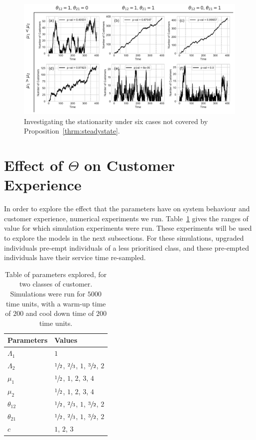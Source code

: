 \documentclass{article}
\begin{document}
\begin{figure}[!htbp]
  \begin{center}
    \includegraphics[width=\textwidth]{img/adf_theorem_gap.pdf}
    \caption{Investigating the stationarity under six cases not covered by
    Proposition~\ref{thrm:steadystate}.}
    \label{fig:adf_gap}
  \end{center}
\end{figure}


\section{Effect of $\Theta$ on Customer Experience}\label{sec:behaviour}
In order to explore the effect that the parameters have on system behaviour and
customer experience, numerical experiments we run.
Table~\ref{tbl:parameter_sweep} gives the ranges of value for which simulation
experiments were run. These experiments will be used to explore the models in
the next subsections. For these simulations, upgraded individuals pre-empt
individuals of a less prioritised class, and these pre-empted individuals have
their service time re-sampled.

\begin{table}
\begin{center}
\begin{tabular}{ll}
\toprule
Parameters & Values \\
\midrule
$\Lambda_1$ & $1$ \\
$\Lambda_2$ & $\sfrac{1}{2}$, $\sfrac{2}{3}$, $1$, $\sfrac{3}{2}$, $2$ \\
$\mu_1$ & $\sfrac{1}{2}$, $1$, $2$, $3$, $4$ \\
$\mu_2$ & $\sfrac{1}{2}$, $1$, $2$, $3$, $4$ \\
$\theta_{12}$ & $\sfrac{1}{2}$, $\sfrac{2}{3}$, $1$, $\sfrac{3}{2}$, $2$ \\
$\theta_{21}$ & $\sfrac{1}{2}$, $\sfrac{2}{3}$, $1$, $\sfrac{3}{2}$, $2$ \\
$c$ & $1$, $2$, $3$ \\
\bottomrule
\end{tabular}
\caption{Table of parameters explored, for two classes of customer. Simulations
         were run for $5000$ time units, with a warm-up time of $200$ and cool
         down time of $200$ time units.}
\label{tbl:parameter_sweep}
\end{center}
\end{table}
\end{document}
